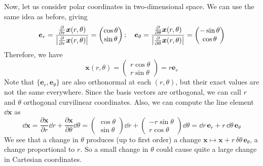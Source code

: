 \documentclass{article}
\begin{document}
Now, let us consider polar coordinates in two-dimensional space. We can use the same idea as before, giving
\[ \bm e_r = \frac{\frac{\partial}{\partial r} \bm x(r, \theta)}{\abs{\frac{\partial}{\partial r} \bm x(r, \theta)}} = \begin{pmatrix}
        \cos\theta \\ \sin\theta
    \end{pmatrix};\quad \bm e_\theta = \frac{\frac{\partial}{\partial \theta} \bm x(r, \theta)}{\abs{\frac{\partial}{\partial \theta} \bm x(r, \theta)}} = \begin{pmatrix}
        -\sin\theta \\ \cos\theta
    \end{pmatrix} \]
Therefore, we have
\[ \bm x(r, \theta) = \begin{pmatrix}
        r \cos\theta \\ r \sin\theta
    \end{pmatrix} = r\bm e_r \]
Note that $\{\bm e_r, \bm e_\theta\}$ are also orthonormal at each $(r, \theta)$, but their exact values are not the same everywhere. Since the basis vectors are orthogonal, we can call $r$ and $\theta$ orthogonal curvilinear coordinates. Also, we can compute the line element $\dd \bm x$ as
\[ \dd \bm x = \frac{\partial \bm x}{\partial r} \dd r + \frac{\partial \bm x}{\partial \theta} \dd \theta = \begin{pmatrix}
        \cos \theta \\ \sin \theta
    \end{pmatrix} \dd r + \begin{pmatrix}
        -r \sin \theta \\ r \cos \theta
    \end{pmatrix} \dd \theta = \dd r \, \bm e_r + r\, \dd \theta \, \bm e_\theta \]
We see that a change in $\theta$ produces (up to first order) a change $\bm x \mapsto \bm x + r \,\delta \theta \,\bm e_\theta$, a change proportional to $r$. So a small change in $\theta$ could cause quite a large change in Cartesian coordinates.
\end{document}
